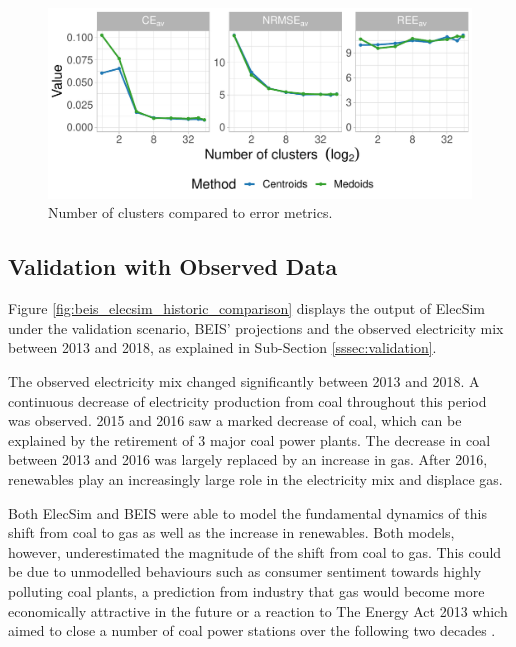 \begin{figure}
	\centering
	\includegraphics[width=\textwidth]{Chapter4/figures/e-Energy-2020/methods_and_materials/clusters_compared_ggplot.pdf}
	\caption{Number of clusters compared to error metrics.}
	\label{fig:error_metrics_vs_cluster_number}
\end{figure}



\subsection{Validation with Observed Data}

Figure \ref{fig:beis_elecsim_historic_comparison} displays the output of ElecSim under the validation scenario, BEIS' projections and the observed electricity mix between 2013 and 2018, as explained in Sub-Section \ref{sssec:validation}.

The observed electricity mix changed significantly between 2013 and 2018. A continuous decrease of electricity production from coal throughout this period was observed. 2015 and 2016 saw a marked decrease of coal, which can be explained by the retirement of 3 major coal power plants. The decrease in coal between 2013 and 2016 was largely replaced by an increase in gas. After 2016, renewables play an increasingly large role in the electricity mix and displace gas.

Both ElecSim and BEIS were able to model the fundamental dynamics of this shift from coal to gas as well as the increase in renewables. Both models, however, underestimated the magnitude of the shift from coal to gas. This could be due to unmodelled behaviours such as consumer sentiment towards highly polluting coal plants, a prediction from industry that gas would become more economically attractive in the future or a reaction to The Energy Act 2013 which aimed to close a number of coal power stations over the following two decades \cite{uk_energy_act}.

